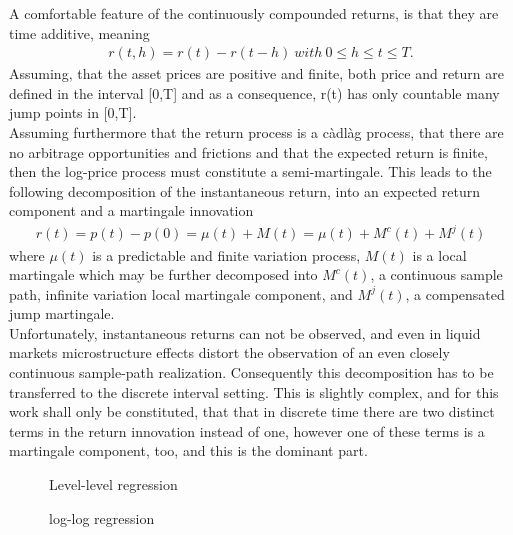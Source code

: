 A comfortable feature of the continuously compounded returns, is that they are time additive, meaning
\begin{align*}
r(t,h) = r(t) - r(t-h) \ with \ 0 \leq h \leq t \leq T.
\end{align*}
Assuming, that the asset prices are positive and finite, both price and return are defined in the interval [0,T] and as a consequence, r(t) has only countable many jump points in [0,T]. \\
Assuming furthermore that the return process is a càdlàg process, that there are no arbitrage opportunities and frictions and  that the expected return is finite, then the log-price process must constitute a semi-martingale. This leads to the following decomposition of the instantaneous return, into an expected return component and a martingale innovation
\begin{align*}
r(t) = p(t) - p(0) = \mu(t) + M(t) = \mu(t) + M^{c}(t) + M^{j}(t)
\end{align*}
where $\mu(t)$ is a predictable and finite variation process, $M(t)$ is a local martingale which may be further decomposed into $M^{c}(t)$, a continuous sample path, infinite variation local martingale component, and $M^{j}(t)$, a compensated jump martingale.\\
Unfortunately, instantaneous returns can not be observed, and even in liquid markets microstructure effects distort the observation of an even closely continuous sample-path realization. Consequently this decomposition has to be transferred to the discrete interval setting. This is slightly complex, and for this work shall only be constituted, that that in discrete time there are two distinct terms in the return innovation instead of one, however one of these terms is a martingale component, too, and this is the dominant part. 

\begin{figure}[!htbp]
\caption{Level-level regression}
\centering

\end{figure}
%
\begin{figure}[!htbp]
\caption{log-log regression}
\centering

\end{figure}
%
